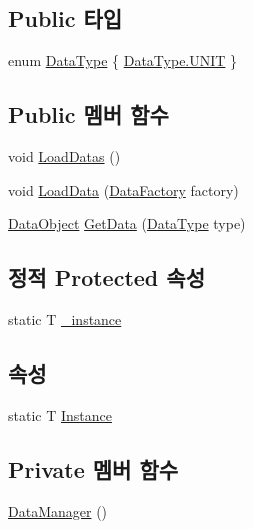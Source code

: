 \subsection*{Public 타입}
\begin{DoxyCompactItemize}
\item 
enum \hyperlink{class_data_manager_ac9cb5bf021d3ebcc7f3eaa4bf5393408}{Data\+Type} \{ \hyperlink{class_data_manager_ac9cb5bf021d3ebcc7f3eaa4bf5393408aec8fc2c42b9c76effd648a14b311411f}{Data\+Type.\+U\+N\+IT}
 \}
\end{DoxyCompactItemize}
\subsection*{Public 멤버 함수}
\begin{DoxyCompactItemize}
\item 
void \hyperlink{class_data_manager_a00011c93858e3f4ff45ee740b62a6035}{Load\+Datas} ()
\item 
void \hyperlink{class_data_manager_a458b89dc0fc8d8f2e744ec90e5c43a89}{Load\+Data} (\hyperlink{class_data_factory}{Data\+Factory} factory)
\item 
\hyperlink{class_data_object}{Data\+Object} \hyperlink{class_data_manager_ae2b53c25ded2918f2f0aa62ca0a6cee9}{Get\+Data} (\hyperlink{class_data_manager_ac9cb5bf021d3ebcc7f3eaa4bf5393408}{Data\+Type} type)
\end{DoxyCompactItemize}
\subsection*{정적 Protected 속성}
\begin{DoxyCompactItemize}
\item 
static T \hyperlink{class_m_c_n_1_1_singletone_a267e8a9e6e7c073b988cda4f95e26eb1}{\+\_\+instance}
\end{DoxyCompactItemize}
\subsection*{속성}
\begin{DoxyCompactItemize}
\item 
static T \hyperlink{class_m_c_n_1_1_singletone_a46dbbebd93e96a9592a9803c51f35602}{Instance}
\end{DoxyCompactItemize}
\subsection*{Private 멤버 함수}
\begin{DoxyCompactItemize}
\item 
\hyperlink{class_data_manager_a35770e76737b1bdbcfdab3d2e5d652e4}{Data\+Manager} ()
\end{DoxyCompactItemize}
